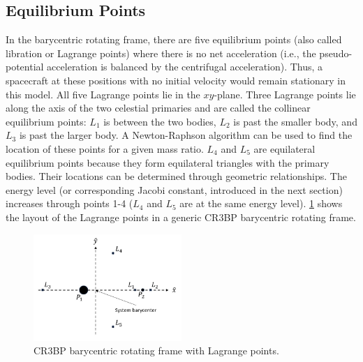 \subsection{Equilibrium Points}
In the barycentric rotating frame, there are five equilibrium points (also called libration or
Lagrange points) where there is no net acceleration (i.e., the pseudo-potential acceleration is
balanced by the centrifugal acceleration). Thus, a spacecraft at these positions with no initial
velocity would remain stationary in this model. All five Lagrange points lie in the $xy$-plane.
Three Lagrange points lie along the axis of the two celestial primaries and are called the
collinear equilibrium points: $L_{1}$ is between the two bodies, $L_{2}$ is past the smaller body,
and $L_{3}$ is past the larger body. A Newton-Raphson algorithm can be used to find the location of
these points for a given mass ratio. $L_{4}$ and $L_{5}$ are equilateral equilibrium points because
they form equilateral triangles with the primary bodies. Their locations can be determined through
geometric relationships. The energy level (or corresponding Jacobi constant, introduced in the next
section) increases through points 1-4 ($L_{4}$ and $L_{5}$ are at the same energy level).
\cref{fig:rotFrame} shows the layout of the Lagrange points in a generic CR3BP barycentric rotating
frame.

\begin{figure}[H]
    \centering
    \includegraphics[width=0.5\textwidth]{figures/RotFrame.jpg}
    \caption{CR3BP barycentric rotating frame with Lagrange points.}
    \label{fig:rotFrame}
\end{figure}

